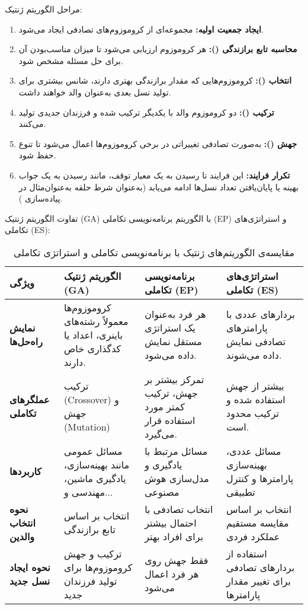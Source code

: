 \documentclass[12pt]{exam}
\begin{document}
\begin{questions}
		\newline \newline
		مراحل الگوریتم ژنتیک:
		\begin{enumerate}
			\item \textbf{ایجاد جمعیت اولیه:}
			مجموعه‌ای از کروموزوم‌های تصادفی ایجاد می‌شود.
			\item \textbf{محاسبه تابع برازندگی ():}
			هر کروموزوم ارزیابی می‌شود تا میزان مناسب‌بودن آن برای حل مسئله مشخص شود.
			\item \textbf{	انتخاب ():}
			کروموزوم‌هایی که مقدار برازندگی بهتری دارند، شانس بیشتری برای تولید نسل بعدی به‌عنوان والد خواهند داشت.
			
			\item \textbf{	ترکیب ():}
			دو کروموزوم والد با یکدیگر ترکیب شده و فرزندان جدیدی تولید می‌کنند.
			
			
			\item \textbf{	جهش (): }
			به‌صورت تصادفی تغییراتی در برخی کروموزوم‌ها اعمال می‌شود تا تنوع حفظ شود.
			
			\item \textbf{تکرار فرایند: }
			این فرایند تا رسیدن به یک معیار توقف، مانند رسیدن به یک جواب بهینه یا پایان‌یافتن تعداد نسل‌ها ادامه می‌یابد (به‌عنوان شرط حلقه
			 به‌عنوان‌مثال در پیاده‌سازی
			 ).
			
		\end{enumerate}
		
		تفاوت الگوریتم ژنتیک (GA) با الگوریتم برنامه‌نویسی تکاملی (EP) و استراتژی‌های تکاملی (ES):
	

\begin{table}[H]
\centering
\begin{tabular}{|p{2.5cm}|p{4cm}|p{4cm}|p{4cm}|}
\hline
\textbf{ویژگی} & \textbf{الگوریتم ژنتیک (GA)} & \textbf{برنامه‌نویسی تکاملی (EP)} & \textbf{استراتژی‌های تکاملی (ES)} \\ \hline
\textbf{
	نمایش راه‌حل‌ها} & کروموزوم‌ها معمولاً رشته‌های باینری، اعداد یا کدگذاری خاص دارند. & هر فرد به‌عنوان یک استراتژی مستقل نمایش داده می‌شود. & بردارهای عددی با پارامترهای تصادفی نمایش داده می‌شوند. \\ \hline
\textbf{عملگرهای تکاملی}
& ترکیب (Crossover) و جهش (Mutation) & تمرکز بیشتر بر جهش، ترکیب کمتر مورد استفاده قرار می‌گیرد. & بیشتر از جهش استفاده شده و ترکیب محدود است. \\ \hline
\textbf{کاربردها}
& مسائل عمومی مانند بهینه‌سازی، یادگیری ماشین، مهندسی و... & مسائل مرتبط با یادگیری و مدل‌سازی هوش مصنوعی & مسائل عددی، بهینه‌سازی پارامترها و کنترل تطبیقی  \\ \hline
\textbf{نحوه انتخاب والدین}
& انتخاب بر اساس تابع برازندگی & انتخاب تصادفی با احتمال بیشتر برای افراد بهتر & انتخاب بر اساس مقایسه مستقیم عملکرد فردی \\ \hline
\textbf{نحوه ایجاد نسل جدید} 
& ترکیب و جهش کروموزوم‌ها برای تولید فرزندان جدید & فقط جهش روی هر فرد اعمال می‌شود & استفاده از بردارهای تصادفی برای تغییر مقدار پارامترها\\ \hline
\end{tabular}
\caption{مقایسه‌ی الگوریتم‌های ژنتیک با برنامه‌نویسی تکاملی و استراتژی تکاملی}
\end{table}
\newpage


\end{questions}
\end{document}
